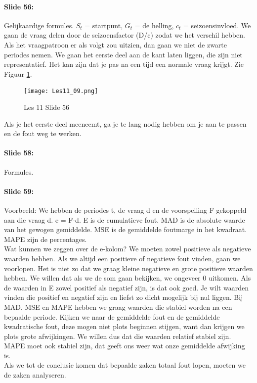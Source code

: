 \documentclass[10pt,a4paper]{report}
\begin{document}
\paragraph{Slide 56:} Gelijkaardige formules. $S_{t}$ = startpunt, $G_{t}$ = de helling, $c_{t}$ = seizoensinvloed. We gaan de vraag delen door de seizoensfactor (D/c) zodat we het verschil hebben.\\
Als het vraagpatroon er als volgt zou uitzien, dan gaan we niet de zwarte periodes nemen. We gaan het eerste deel aan de kant laten liggen, die zijn niet representatief. Het kan zijn dat je pas na een tijd een normale vraag krijgt. Zie Figuur \ref{les11_09}. \\

\begin{figure}[h!]
\centering
\texttt{[image: Les11\_09.png]}
\caption{Les 11 Slide 56} 
\label{les11_09}
\end{figure}

Als je het eerste deel meeneemt, ga je te lang nodig hebben om je aan te passen en de fout weg te werken.

\paragraph{Slide 58:} Formules.

\paragraph{Slide 59:} Voorbeeld: We hebben de periodes t, de vraag d en de voorspelling F gekoppeld aan die vraag d. e = F-d. E is de cumulatieve fout. MAD is de absolute waarde van het gewogen gemiddelde. MSE is de gemiddelde foutmarge in het kwadraat. MAPE zijn de percentages.\\
Wat kunnen we zeggen over de e-kolom? We moeten zowel positieve als negatieve waarden hebben. Als we altijd een positieve of negatieve fout vinden, gaan we voorlopen. Het is niet zo dat we graag kleine negatieve en grote positieve waarden hebben. We willen dat als we de som gaan bekijken, we ongeveer 0 uitkomen. Als de waarden in E zowel positief als negatief zijn, is dat ook goed. Je wilt waarden vinden die positief en negatief zijn en liefst zo dicht mogelijk bij nul liggen. Bij MAD, MSE en MAPE hebben we graag waarden die stabiel worden na een bepaalde periode. Kijken we naar de gemiddelde fout en de gemiddelde kwadratische fout, deze mogen niet plots beginnen stijgen, want dan krijgen we plots grote afwijkingen. We willen dus dat die waarden relatief stabiel zijn. MAPE moet ook stabiel zijn, dat geeft ons weer wat onze gemiddelde afwijking is.\\
Als we tot de conclusie komen dat bepaalde zaken totaal fout lopen, moeten we de zaken analyseren.
\end{document}
